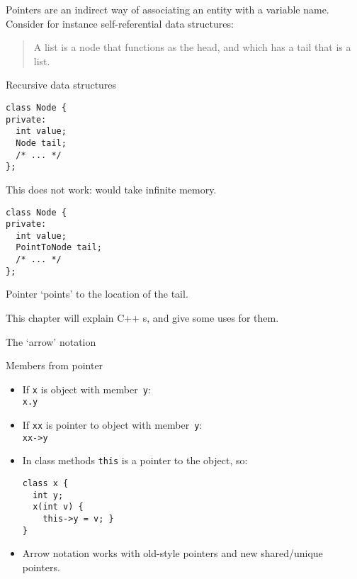 

Pointers are an indirect way of associating an entity with a variable
name. Consider for instance self-referential data structures:
\begin{quote}
  A list is a node that functions as the head, and which has a tail
  that is a list.
\end{quote}

\begin{block}{Recursive data structures}
  \label{sl:recursive-node}
\begin{lstlisting}
class Node {
private:
  int value;
  Node tail;
  /* ... */
};
\end{lstlisting}
This does not work: would take infinite memory.
\begin{lstlisting}
class Node {
private:
  int value;
  PointToNode tail;
  /* ... */
};
\end{lstlisting}
  Pointer `points' to the location of the tail.
\end{block}

This chapter will explain C++ s, and give some uses for them.

 {The `arrow' notation}

\begin{block}{Members from pointer}
  \begin{itemize}
  \item If \lstinline{x} is object with member~\lstinline{y}:\\ \lstinline{x.y}
  \item If \lstinline{xx} is pointer to object with member~\lstinline{y}:\\ \lstinline{xx->y}
  \item In class methods \lstinline{this} is a pointer to the object, so:
\begin{lstlisting}
class x {
  int y;
  x(int v) {
    this->y = v; }
}
\end{lstlisting}
\item Arrow notation works with old-style pointers and new
  shared/unique pointers.
  \end{itemize}
\end{block}

